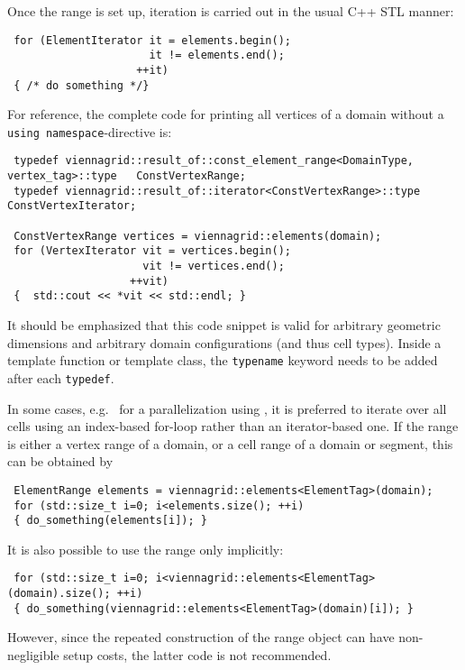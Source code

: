 Once the range is set up, iteration is carried out in the usual C++ STL manner:
\begin{lstlisting}
 for (ElementIterator it = elements.begin();
                      it != elements.end();
                    ++it)
 { /* do something */}
\end{lstlisting}
For reference, the complete code for printing all vertices of a domain without a \lstinline|using namespace|-directive is:
\begin{lstlisting}
 typedef viennagrid::result_of::const_element_range<DomainType, vertex_tag>::type   ConstVertexRange;
 typedef viennagrid::result_of::iterator<ConstVertexRange>::type         ConstVertexIterator;

 ConstVertexRange vertices = viennagrid::elements(domain);
 for (VertexIterator vit = vertices.begin();
                     vit != vertices.end();
                   ++vit)
 {  std::cout << *vit << std::endl; }
\end{lstlisting}
It should be emphasized that this code snippet is valid for arbitrary geometric dimensions and arbitrary domain configurations (and thus cell types). Inside a template function or template class, the \lstinline|typename| keyword needs to be added after each \lstinline|typedef|.



In some cases, e.g.~ for a parallelization using \OpenMP \cite{openmp}, it is preferred to iterate over all cells using an index-based for-loop rather than an iterator-based one.
If the range is either a vertex range of a domain, or a cell range of a domain or segment, this can be obtained by
\begin{lstlisting}
 ElementRange elements = viennagrid::elements<ElementTag>(domain);
 for (std::size_t i=0; i<elements.size(); ++i)
 { do_something(elements[i]); }
\end{lstlisting}
It is also possible to use the range only implicitly:
\begin{lstlisting}
 for (std::size_t i=0; i<viennagrid::elements<ElementTag>(domain).size(); ++i)
 { do_something(viennagrid::elements<ElementTag>(domain)[i]); }
\end{lstlisting}
However, since the repeated construction of the range object can have non-negligible setup costs, the latter code is not recommended.


